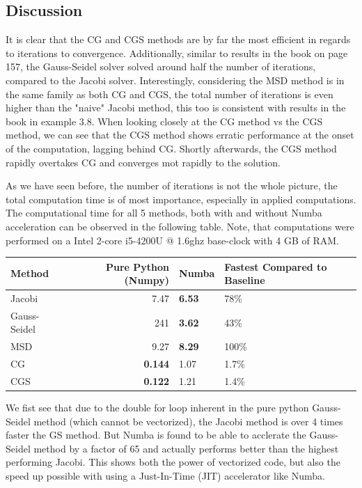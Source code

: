 \documentclass[11pt]{article}
\begin{document}
\subsection{Discussion}
\label{sec-1-9}
It is clear that the CG and CGS methods are by far the most efficient in regards to iterations to convergence. Additionally, similar to results in the book on page 157, the Gauss-Seidel solver solved around half the number of iterations, compared to the Jacobi solver. Interestingly, considering the MSD method is in the same family as both CG and CGS, the total number of iterations is even higher than the "naive" Jacobi method, this too is consistent with results in the book in example 3.8.   
When looking closely at the CG method vs the CGS method, we can see that the CGS method shows erratic performance at the onset of the computation, lagging behind CG. Shortly afterwards, the CGS method rapidly overtakes CG and converges mot rapidly to the solution.

As we have seen before, the number of iterations is not the whole picture, the total computation time is of most importance, especially in applied computations.  The computational time for all 5 methods, both with and without Numba acceleration can be observed in the following table. Note, that computations were performed on a Intel 2-core i5-4200U @ 1.6ghz base-clock with 4 GB of RAM.
\begin{center}
\begin{tabular}{lrll}
\hline
Method & Pure Python (Numpy) & Numba & Fastest Compared to Baseline\\
\hline
Jacobi & 7.47 & \textbf{6.53} & 78\%\\
Gauss-Seidel & 241 & \textbf{3.62} & 43\%\\
MSD & 9.27 & \textbf{8.29} & 100\%\\
CG & \textbf{0.144} & 1.07 & 1.7\%\\
CGS & \textbf{0.122} & 1.21 & 1.4\%\\
\hline
\end{tabular}
\end{center}

We fist see that due to the double for loop inherent in the pure python Gauss-Seidel method (which cannot be vectorized), the Jacobi method is over 4 times faster the GS method. But Numba is found to be able to  acclerate the Gauss-Seidel method by a factor of 65 and actually performs better than the highest performing Jacobi.  This shows both the power of vectorized code, but also the speed up possible with using a Just-In-Time (JIT) accelerator like Numba.  
\end{document}
